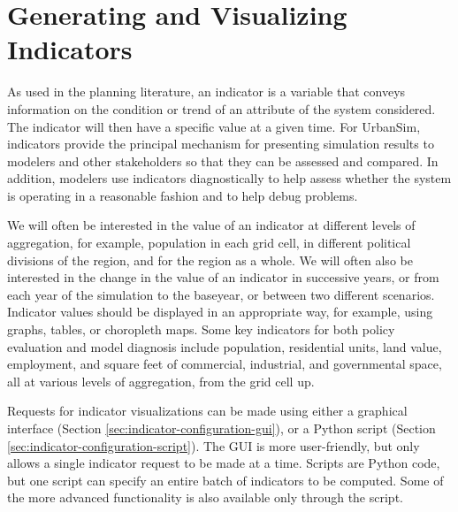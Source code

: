 
\chapter{Generating and Visualizing Indicators}
\indicatorsindex

As used in the planning literature, an indicator is a
variable \variablesindex that conveys information on the condition or
trend of an attribute \attributesindex of the system considered.  The
indicator will then have a specific value at a given time.
For UrbanSim, indicators provide the principal mechanism
for presenting simulation results to modelers and other stakeholders so
that they can be assessed and compared.  In addition, modelers use
indicators diagnostically to help assess whether the
system is operating in a reasonable fashion and to help debug problems.

We will often be interested in the value of an indicator at different levels of
aggregation, for example, 
population in each grid cell, in different political divisions of
the region, and for the region as a whole.  We will often also be
interested in the change in the value of an indicator
in successive years, or from each year of the
simulation to the baseyear, or between two different scenarios.
Indicator values should be displayed in an
appropriate way, for example, using graphs,
 tables,  or choropleth maps.
 Some key indicators for both policy
evaluation and model diagnosis include population, residential
units, land value, employment, and square feet of commercial,
industrial, and governmental space, all at various levels of
aggregation, from the grid cell up.

Requests for indicator visualizations can be made using either a graphical
interface (Section \ref{sec:indicator-configuration-gui}), or a Python
script (Section \ref{sec:indicator-configuration-script}).  The GUI is more
user-friendly, but only allows a single indicator request to be made at a
time.  Scripts are Python code, but one script can specify an entire
batch of indicators to be computed. Some of the more advanced functionality is
also available only through the script. 

